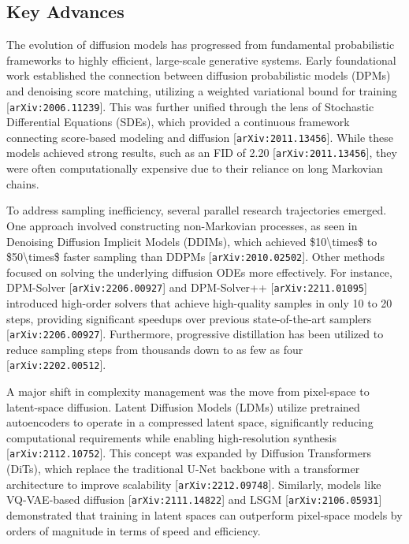 \documentclass[11pt]{article}
\begin{document}
\subsection{Key Advances}

The evolution of diffusion models has progressed from fundamental probabilistic frameworks to highly efficient, large-scale generative systems. Early foundational work established the connection between diffusion probabilistic models (DPMs) and denoising score matching, utilizing a weighted variational bound for training [\texttt{arXiv:2006.11239}]. This was further unified through the lens of Stochastic Differential Equations (SDEs), which provided a continuous framework connecting score-based modeling and diffusion [\texttt{arXiv:2011.13456}]. While these models achieved strong results, such as an FID of 2.20 [\texttt{arXiv:2011.13456}], they were often computationally expensive due to their reliance on long Markovian chains.

To address sampling inefficiency, several parallel research trajectories emerged. One approach involved constructing non-Markovian processes, as seen in Denoising Diffusion Implicit Models (DDIMs), which achieved \$10\textbackslash{}times\$ to \$50\textbackslash{}times\$ faster sampling than DDPMs [\texttt{arXiv:2010.02502}]. Other methods focused on solving the underlying diffusion ODEs more effectively. For instance, DPM-Solver [\texttt{arXiv:2206.00927}] and DPM-Solver++ [\texttt{arXiv:2211.01095}] introduced high-order solvers that achieve high-quality samples in only 10 to 20 steps, providing significant speedups over previous state-of-the-art samplers [\texttt{arXiv:2206.00927}]. Furthermore, progressive distillation has been utilized to reduce sampling steps from thousands down to as few as four [\texttt{arXiv:2202.00512}].

A major shift in complexity management was the move from pixel-space to latent-space diffusion. Latent Diffusion Models (LDMs) utilize pretrained autoencoders to operate in a compressed latent space, significantly reducing computational requirements while enabling high-resolution synthesis [\texttt{arXiv:2112.10752}]. This concept was expanded by Diffusion Transformers (DiTs), which replace the traditional U-Net backbone with a transformer architecture to improve scalability [\texttt{arXiv:2212.09748}]. Similarly, models like VQ-VAE-based diffusion [\texttt{arXiv:2111.14822}] and LSGM [\texttt{arXiv:2106.05931}] demonstrated that training in latent spaces can outperform pixel-space models by orders of magnitude in terms of speed and efficiency.
\end{document}
